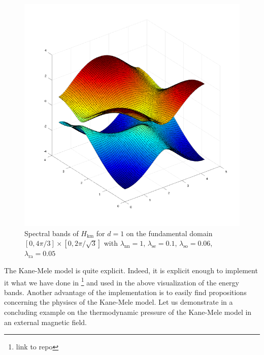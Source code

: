 \begin{enumerate}
\begin{figure}[H]
\includegraphics[scale=0.4]{graphics/specrash.png}
\caption{Spectral bands of $H_{\textrm{km}}$ for $d = 1$ on the fundamental domain $[0,4\pi/3] \times [0,2\pi/\sqrt{3}]$ with $\lambda_{\textrm{nn}} = 1$, $\lambda_{\textrm{se}} = 0.1$, $\lambda_{\textrm{so}} = 0.06$, $\lambda_{\textrm{ra}} = 0.05$}
\label{fig:specrash}
\end{figure}
\end{enumerate}
The Kane-Mele model is quite explicit. Indeed, it is explicit enough to implement it what we have done in \footnote{link to repo} and used in the above visualization of the energy bands. Another advantage of the implementation is to easily find propositions concerning the physiscs of the Kane-Mele model. Let us demonstrate in a concluding example on the thermodynamic pressure of the Kane-Mele model in an external magnetic field.
\\
